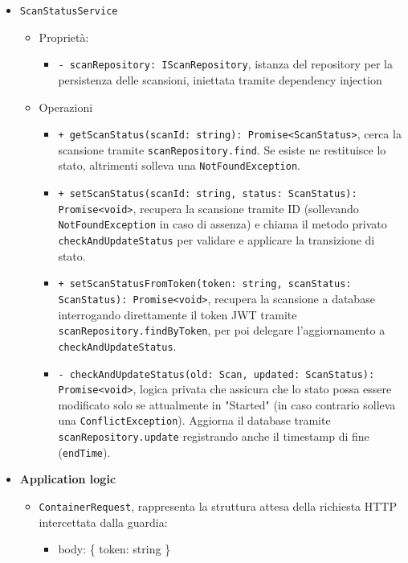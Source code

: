 \documentclass[a4paper, 11pt]{article}
\newcounter{subsubsubsection}[subsubsection]
\newcounter{subsubsubsubsection}[subsubsubsection]
\begin{document}
\begin{itemize}
\begin{itemize}
      \item \texttt{ScanStatusService}
        \begin{itemize}
          \item Proprietà:
            \begin{itemize}
              \item \texttt{- scanRepository: IScanRepository}, istanza del repository per la persistenza delle scansioni, iniettata tramite dependency injection
            \end{itemize}
          \item Operazioni
            \begin{itemize}
              \item \texttt{+ getScanStatus(scanId: string): Promise<ScanStatus>}, cerca la scansione tramite \texttt{scanRepository.find}. Se esiste ne restituisce lo stato, altrimenti solleva una \texttt{NotFoundException}.
              \item \texttt{+ setScanStatus(scanId: string, status: ScanStatus): Promise<void>}, recupera la scansione tramite ID (sollevando \texttt{NotFoundException} in caso di assenza) e chiama il metodo privato \texttt{checkAndUpdateStatus} per validare e applicare la transizione di stato.
              \item \texttt{+ setScanStatusFromToken(token: string, scanStatus: ScanStatus): Promise<void>}, recupera la scansione a database interrogando direttamente il token JWT tramite \texttt{scanRepository.findByToken}, per poi delegare l'aggiornamento a \texttt{checkAndUpdateStatus}.
              \item \texttt{- checkAndUpdateStatus(old: Scan, updated: ScanStatus): Promise<void>}, logica privata che assicura che lo stato possa essere modificato solo se attualmente in "Started" (in caso contrario solleva una \texttt{ConflictException}). Aggiorna il database tramite \texttt{scanRepository.update} registrando anche il timestamp di fine (\texttt{endTime}).
            \end{itemize}
        \end{itemize}
    \end{itemize}
\end{itemize}
\newpage
{}

\begin{itemize}
  \item \textbf{Application logic}
      \begin{itemize}
          \item \texttt{ContainerRequest}, rappresenta la struttura attesa della richiesta HTTP intercettata dalla guardia:
          \begin{itemize}
                \item body: \{ token: string \}
            \end{itemize}
      \end{itemize}
\end{itemize}
\end{document}
